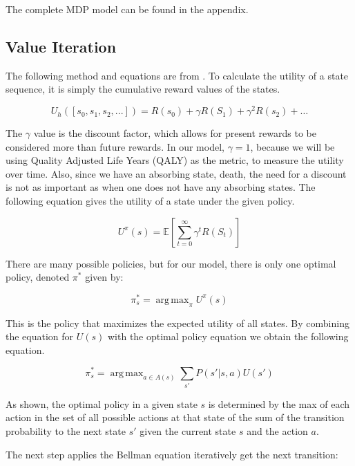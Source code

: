 \documentclass[10pt,twocolumn]{article}
\DeclareMathOperator*{\argmax}{arg\,max}
\begin{document}
The complete MDP model can be found in the appendix.

\subsection{Value Iteration}

The following method and equations are from \cite{ai}. To calculate the utility of a state sequence, it is simply the cumulative reward values of the states.

\begin{equation*}
 U_h([s_0, s_1, s_2, ...]) = R(s_0) + \gamma R(S_1) + \gamma ^2R(s_2) + \dots
\end{equation*}    

The \(\gamma\) value is the discount factor, which allows for present rewards to be considered more than future rewards. In our model, \(\gamma = 1\), because we will be using Quality Adjusted Life Years (QALY) as the metric, to measure the utility over time. Also, since we have an absorbing state, death, the need for a discount is not as important as when one does not have any absorbing states. The following equation gives the utility of a state under the given policy.

\begin{equation*}
 U^{\pi}(s) = \mathbb{E} \left[ \sum_{t=0}^{\infty} \gamma^t R(S_t) \right]
\end{equation*}

There are many possible policies, but for our model, there is only one optimal policy, denoted \(\pi^*\) given by:

\begin{equation*}
    \pi^*_s = \argmax_\pi U^{\pi} (s)
\end{equation*}

This is the policy that maximizes the expected utility of all states. By combining the equation for \(U(s)\) with the optimal policy equation we obtain the following equation.

\begin{equation*}
  \pi^*_s = \argmax_{a \in A(s)} \sum_{s'} P(s'|s, a)U(s')
\end{equation*}

As shown, the optimal policy in a given state \(s\) is determined by the max of each action in the set of all possible actions at that state of the sum of the transition probability to the next state \(s'\) given the current state \(s\) and the action \(a\). 

The next step applies the Bellman equation iteratively get the next transition:
\end{document}
